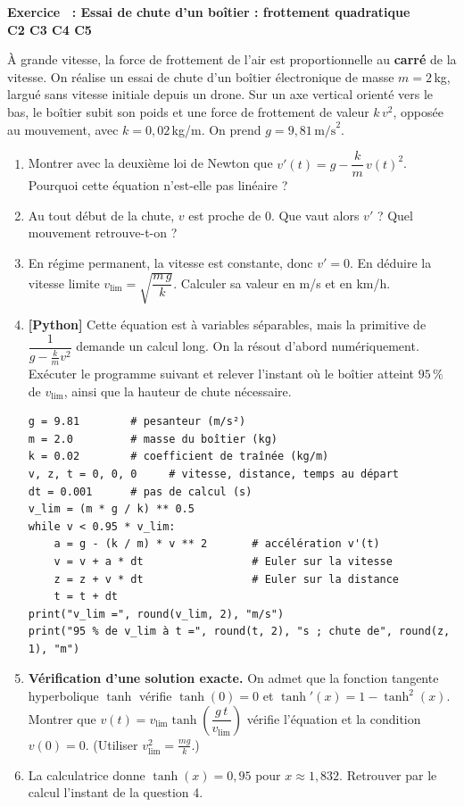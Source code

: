 \documentclass[a4paper,11pt]{article}
\newcounter{exo}
\newcommand{\exo}[4]{\needspace{0.5\textheight}\refstepcounter{exo}\label{exo:\theexo}\vspace{8pt}%
\begin{tcolorbox}[colback=uimmlightblue, colframe=uimmblue, boxrule=0.8pt, arc=2pt, left=6pt, right=6pt, top=3pt, bottom=3pt]
{\color{uimmblue}\bfseries Exercice \theexo\ : #1}\\
{\small\color{uimmred}\bfseries #2\quad #3}%
\if\relax\detokenize{#4}\relax\else\\{\footnotesize\color{uimmgray}\itshape #4}\fi
\end{tcolorbox}}
\newcommand{\rep}[1]{\par\noindent\begin{minipage}[t][#1cm]{\linewidth}\mbox{}\end{minipage}\par}
\newcommand{\py}{{\color{uimmred}\small\bfseries[Python]}}
\begin{document}
\exo{Essai de chute d'un boîtier : frottement quadratique}{C2 C3 C4 C5}{[S01] [C01]}{}
À grande vitesse, la force de frottement de l'air est proportionnelle au \textbf{carré} de la vitesse. On réalise un essai de chute d'un boîtier électronique de masse $m = 2$\,kg, largué sans vitesse initiale depuis un drone. Sur un axe vertical orienté vers le bas, le boîtier subit son poids et une force de frottement de valeur $k\,v^2$, opposée au mouvement, avec $k = 0{,}02$\,kg/m. On prend $g = 9{,}81\,\text{m/s}^2$.
\begin{enumerate}
  \needspace{4.6cm}
  \item Montrer avec la deuxième loi de Newton que $v'(t) = g - \dfrac{k}{m}\,v(t)^2$. Pourquoi cette équation n'est-elle pas linéaire ?
  \rep{2.5}
  \needspace{4.1cm}
  \item Au tout début de la chute, $v$ est proche de $0$. Que vaut alors $v'$ ? Quel mouvement retrouve-t-on ?
  \rep{2}
  \needspace{4.6cm}
  \item En régime permanent, la vitesse est constante, donc $v' = 0$. En déduire la vitesse limite $v_{\lim} = \sqrt{\dfrac{m\,g}{k}}$. Calculer sa valeur en m/s et en km/h.
  \rep{2.5}
  \needspace{10.5cm}
  \item \py{} Cette équation est à variables séparables, mais la primitive de $\dfrac{1}{g - \frac{k}{m}v^2}$ demande un calcul long. On la résout d'abord numériquement. Exécuter le programme suivant et relever l'instant où le boîtier atteint $95\,\%$ de $v_{\lim}$, ainsi que la hauteur de chute nécessaire.
\begin{lstlisting}[style=uimmpython]
g = 9.81        # pesanteur (m/s²)
m = 2.0         # masse du boîtier (kg)
k = 0.02        # coefficient de traînée (kg/m)
v, z, t = 0, 0, 0     # vitesse, distance, temps au départ
dt = 0.001      # pas de calcul (s)
v_lim = (m * g / k) ** 0.5
while v < 0.95 * v_lim:
    a = g - (k / m) * v ** 2       # accélération v'(t)
    v = v + a * dt                 # Euler sur la vitesse
    z = z + v * dt                 # Euler sur la distance
    t = t + dt
print("v_lim =", round(v_lim, 2), "m/s")
print("95 % de v_lim à t =", round(t, 2), "s ; chute de", round(z, 1), "m")
\end{lstlisting}
  \rep{1.5}
  \needspace{7.6cm}
  \item \textbf{Vérification d'une solution exacte.} On admet que la fonction tangente hyperbolique $\tanh$ vérifie $\tanh(0) = 0$ et $\tanh'(x) = 1 - \tanh^2(x)$. Montrer que $v(t) = v_{\lim}\tanh\!\left(\dfrac{g\,t}{v_{\lim}}\right)$ vérifie l'équation et la condition $v(0) = 0$. (Utiliser $v_{\lim}^2 = \frac{m g}{k}$.)
  \rep{4.5}
  \needspace{4.1cm}
  \item La calculatrice donne $\tanh(x) = 0{,}95$ pour $x \approx 1{,}832$. Retrouver par le calcul l'instant de la question 4.
  \rep{2}
\end{enumerate}
\end{document}
